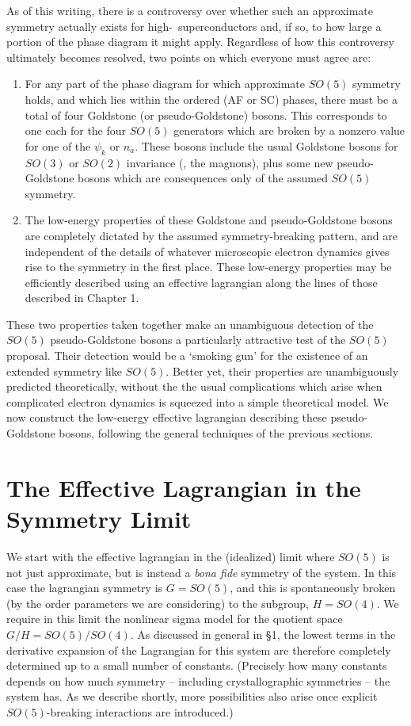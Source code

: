 As of this writing, there is a controversy over whether
such an approximate symmetry actually exists for  high-\Tc\
superconductors and, if so, to how large a  portion of the
phase diagram  it might apply. Regardless of how this
controversy ultimately becomes resolved,  two points on
which everyone must agree are:
%
\begin{enumerate}
\item
For any part of the phase diagram for which approximate
$SO(5)$ symmetry holds, and which lies within the ordered
(AF or SC) phases, there must be a total of four Goldstone
(or pseudo-Goldstone) bosons. This corresponds to one each
for the four $SO(5)$ generators which are broken by a
nonzero value for one of the $\psi_k$ or $n_a$. These
bosons include the usual Goldstone bosons for $SO(3)$ or
$SO(2)$ invariance (\eg, the magnons), plus some new
pseudo-Goldstone bosons which are consequences only of the
assumed $SO(5)$ symmetry.

\item
The low-energy properties of these Goldstone  and
pseudo-Goldstone bosons are completely dictated by the
assumed symmetry-breaking pattern, and  are independent of
the details of whatever microscopic electron dynamics gives
rise to the symmetry in the first place. These low-energy
properties may be efficiently described using an effective
lagrangian along the lines of those described in  Chapter 1.
%
\end{enumerate}
%
These two properties taken together make an unambiguous
detection of the $SO(5)$ pseudo-Goldstone bosons a
particularly attractive test of the $SO(5)$ proposal. Their
detection would be a `smoking gun' for the existence of an 
extended symmetry like $SO(5)$. Better yet, their
properties are unambiguously predicted theoretically,
without the  the usual complications which arise when
complicated electron dynamics is squeezed into a simple
theoretical model. We now construct the low-energy
effective lagrangian describing these pseudo-Goldstone
bosons, following the general techniques of the previous
sections.

\section{The Effective Lagrangian in the Symmetry Limit}

We start with the effective lagrangian in the (idealized)
limit where $SO(5)$ is not just approximate, but is instead
a {\it bona fide} symmetry of the system. In this case the
lagrangian symmetry is $G = SO(5)$, and this is
spontaneously broken (by the order parameters we are
considering) to the subgroup, $H = SO(4)$. We require in
this limit the nonlinear sigma model for the quotient space
$G/H = SO(5)/SO(4)$. As discussed in general in \S1, the
lowest terms in the derivative expansion of the Lagrangian
for this system are therefore completely determined up to a
small number of constants. (Precisely how many constants
depends on how much symmetry -- including crystallographic
symmetries -- the system has. As we describe shortly, more
possibilities also arise once explicit $SO(5)$-breaking
interactions are introduced.)

